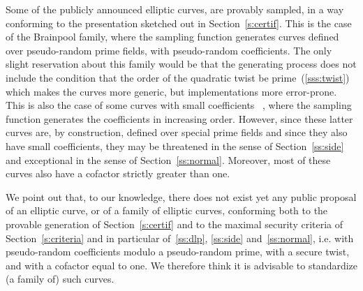 \documentclass[twocolumn,letterpaper,10pt]{article}
\begin{document}
Some of the publicly announced elliptic curves,
are provably sampled, in a way conforming to the presentation
sketched out in Section~\ref{s:certif}.
This is the case of the Brainpool family,
where the sampling function generates
curves defined over pseudo-random prime fields,
with pseudo-random coefficients.
The only slight reservation about this family
would be that the generating process does not
include the condition that the order of the quadratic twist be
prime~(\ref{sss:twist}) which makes the curves more generic,
but implementations more error-prone.
This is also the case of some curves with small coefficients%
~\cite{pkc2006bernstein,msr2014bcln},
where the sampling function generates the coefficients
in increasing order.
However, since these latter curves are, by construction,
defined over special prime fields
and since they also have small coefficients,
they may be threatened in the sense of Section~\ref{ss:side}
and exceptional in the sense of Section~\ref{ss:normal}.
Moreover, most of these curves
also have a cofactor strictly greater than one.

\bigbreak

We point out that, to our knowledge,
there does not exist yet any public proposal of an elliptic curve,
or of a family of elliptic curves, conforming both
to the provable generation of Section~\ref{s:certif}
and to the maximal security criteria of Section~\ref{s:criteria}
and in particular of~\ref{ss:dlp}, \ref{ss:side} and~\ref{ss:normal},
i.e. with pseudo-random coefficients
modulo a pseudo-random prime,
with a secure twist,
and with a cofactor equal to one.
We therefore think it is advisable to standardize (a family of) such curves.



\end{document}
